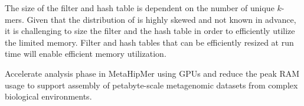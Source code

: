 The size of the filter and hash table is dependent on the number of unique $k$-mers. Given that the distribution of \kmers is highly skewed and not known in advance, it is challenging to size the filter and the hash table in order to efficiently utilize the limited memory. Filter and hash tables that can be efficiently resized at run time will enable efficient memory utilization. 


\begin{rproblem}
Accelerate \kmer analysis phase in MetaHipMer using GPUs and reduce the peak RAM usage to support assembly of petabyte-scale metagenomic datasets from complex biological environments.
\label{rprob:peppermint4}
\end{rproblem}

